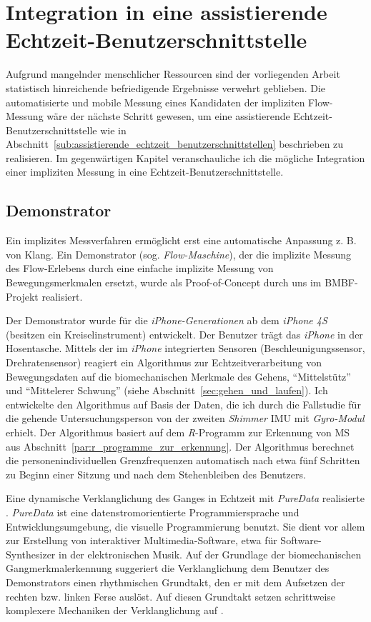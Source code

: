 \chapter{Integration in eine assistierende Echtzeit-Benutzerschnittstelle}
\label{cha:integration_in_eine_assistierende_echtzeit_benutzerschnittstelle}
Aufgrund mangelnder menschlicher Ressourcen sind der vorliegenden Arbeit statistisch hinreichende befriedigende Ergebnisse verwehrt geblieben. Die automatisierte und mobile Messung eines Kandidaten der impliziten Flow-Messung wäre der nächste Schritt gewesen, um eine assistierende Echtzeit-Benutzerschnittstelle wie in Abschnitt~\ref{sub:assistierende_echtzeit_benutzerschnittstellen} beschrieben zu realisieren. Im gegenwärtigen Kapitel veranschauliche ich die mögliche Integration einer impliziten Messung in eine Echtzeit-Benutzerschnittstelle.

\section{Demonstrator}
\label{sec:demonstrator}
Ein implizites Messverfahren ermöglicht erst eine automatische Anpassung z. B. von Klang. Ein Demonstrator (sog. \emph{Flow-Maschine}), der die implizite Messung des Flow-Erlebens durch eine einfache implizite Messung von Bewegungsmerkmalen ersetzt, wurde als Proof-of-Concept durch uns im \acs{BMBF}-Projekt realisiert.

Der Demonstrator wurde für die \emph{iPhone-Generationen} ab dem \emph{iPhone 4S} (besitzen ein Kreiselinstrument) entwickelt. Der Benutzer trägt das \emph{iPhone} in der Hosentasche. Mittels der im \emph{iPhone} integrierten Sensoren (Beschleunigungssensor, Drehratensensor) reagiert ein Algorithmus zur Echtzeitverarbeitung von Bewegungsdaten auf die biomechanischen Merkmale des Gehens, "`Mittelstütz"' und "`Mittelerer Schwung"' (siehe Abschnitt~\ref{sec:gehen_und_laufen}). Ich entwickelte den Algorithmus auf Basis der Daten, die ich durch die Fallstudie für die gehende Untersuchungsperson von der zweiten \emph{Shimmer} \ac{IMU} mit \emph{Gyro-Modul} erhielt. Der Algorithmus basiert auf dem \emph{R}-Programm zur Erkennung von \ac{MS} aus Abschnitt~\ref{par:r_programme_zur_erkennung}. Der Algorithmus berechnet die personenindividuellen Grenzfrequenzen automatisch nach etwa fünf Schritten zu Beginn einer Sitzung und nach dem Stehenbleiben des Benutzers.

Eine dynamische Verklanglichung des Ganges in Echtzeit mit \emph{PureData} realisierte \citet{Hajinejad}. \emph{PureData} ist eine datenstromorientierte Programmiersprache und Entwicklungsumgebung, die visuelle Programmierung benutzt. Sie dient vor allem zur Erstellung von interaktiver Multimedia-Software, etwa für Software-Synthesizer in der elektronischen Musik. Auf der Grundlage der biomechanischen Gangmerkmalerkennung suggeriert die Verklanglichung dem Benutzer des Demonstrators einen rhythmischen Grundtakt, den er mit dem Aufsetzen der rechten bzw. linken Ferse auslöst. Auf diesen Grundtakt setzen schrittweise komplexere Mechaniken der Verklanglichung auf \citep[vgl.][]{Hajinejad}.


